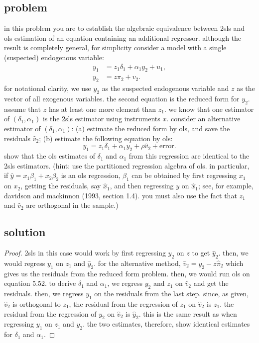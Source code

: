 \documentclass[10pt, a4paper]{article}
\begin{document}
    \subsection*{problem}
      in this problem you are to establish the algebraic equivalence between 2sls and ols estimation of an equation containing an additional regressor. although the result is completely general, for simplicity consider a model with a single (suspected) endogenous variable:
      \begin{align*}
      y_1 &= z_1\delta_1 + \alpha_1 y_2 + u_1, \\
      y_2 &= z\pi_2 + v_2.
      \end{align*}
      for notational clarity, we use $y_2$ as the suspected endogenous variable and $z$ as the vector of all exogenous variables. the second equation is the reduced form for $y_2$.
      assume that $z$ has at least one more element than $z_1$.
      we know that one estimator of $(\delta_1, \alpha_1)$ is the 2sls estimator using instruments $x$. consider an alternative estimator of $(\delta_1, \alpha_1)$:
      (a) estimate the reduced form by ols, and save the residuals $\hat{v}_2$;
      (b) estimate the following equation by ols:
      \begin{equation}
      y_1 = z_1\delta_1 + \alpha_1 y_2 + \rho\hat{v}_2 + \text{error}. \tag{5.52}
      \end{equation}
      show that the ols estimates of $\delta_1$ and $\alpha_1$ from this regression are identical to the 2sls estimators. (hint: use the partitioned regression algebra of ols. in particular, if $\hat{y} = x_1\beta_1 + x_2\beta_2$ is an ols regression, $\beta_1$ can be obtained by first regressing $x_1$ on $x_2$, getting the residuals, say $\hat{x}_1$, and then regressing $y$ on $\hat{x}_1$; see, for example, davidson and mackinnon (1993, section 1.4). you must also use the fact that $z_1$ and $\hat{v}_2$ are orthogonal in the sample.)
    \subsection*{solution}
      \begin{proof}
        2sls in this case would work by first regressing $y_2$ on $z$ to get $\hat{y}_2$. then, we would regress $y_1$ on $z_1$ and $\hat{y}_2$. for the alternative method, $\hat{v}_2 = y_2 - z\hat{\pi}_2$ which gives us the residuals from the reduced form problem. then, we would run ols on equation 5.52. to derive $\delta_1$ and $\alpha_1$, we regress $y_2$ and $z_1$ on $\hat{v}_2$ and get the residuals. then, we regress $y_1$ on the residuals from the last step. since, as given, $\hat{v}_2$ is orthogonal to $z_1$, the residual from the regression of $z_1$ on $\hat{v}_2$ is $z_1$. the residual from the regression of $y_2$ on $\hat{v}_2$ is $\hat{y}_2$. this is the same result as when regressing $y_1$ on $z_1$ and $\hat{y}_2$. the two estimates, therefore, show identical estimates for $\delta_1$ and $\alpha_1$. 
      \end{proof}
\end{document}
